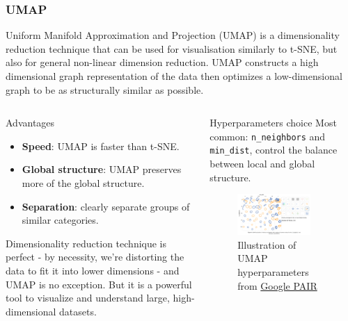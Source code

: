 \documentclass[10pt, aspectratio = 169]{beamer}
\begin{document}
\begin{frame}
    \frametitle{UMAP}
    \small
    Uniform Manifold Approximation and Projection (UMAP) is a dimensionality 
    reduction technique that can be used for visualisation similarly to t-SNE,
    but also for general non-linear dimension reduction.
    UMAP constructs a high dimensional graph representation of the data 
    then optimizes a low-dimensional graph to be as structurally similar as possible.
    \begin{columns}[t]
        \begin{column}{0.6\textwidth}
            \begin{block}{Advantages}
                
                \begin{itemize}
                    \scriptsize
                    \item \textbf{Speed}: UMAP is faster than t-SNE.
                    \item \textbf{Global structure}: UMAP preserves more of the global structure.
                    \item \textbf{Separation}: clearly separate groups of similar categories.
                \end{itemize}
            \end{block}
            Dimensionality reduction technique is perfect - by necessity, we're distorting the data to fit it into lower dimensions - 
            and UMAP is no exception. But it is a powerful tool to visualize and understand large, high-dimensional datasets.
        \end{column}
        \begin{column}{0.4\textwidth}
            \begin{alertblock}{Hyperparameters choice}
                \scriptsize
                Most common: \texttt{n\_neighbors} and \texttt{min\_dist}, control the balance between local and global structure.

            \end{alertblock}
            \begin{figure}
                \includegraphics[width=0.8\textwidth]{figures/UMAP_hyperparam.png}
                \caption{\scriptsize Illustration of UMAP hyperparameters from 
                    \href{https://pair-code.github.io/understanding-umap/index.html}{Google PAIR}}
                
            \end{figure}
        \end{column}
    \end{columns}


\end{frame}
\end{document}
